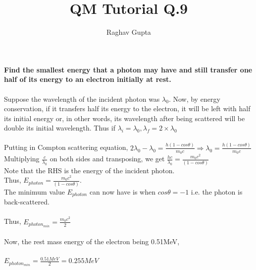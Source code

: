 \documentclass{article}
\begin{document}
\title{QM Tutorial Q.9}
\author{Raghav Gupta}
\maketitle
\textbf{Find the smallest energy that a photon may have and still transfer one half of its
energy to an electron initially at rest.}\\\\Suppose the wavelength of the incident photon was \(\lambda_0\). Now, by energy conservation, if it transfers half its energy to the electron, it will be left with half its initial energy or, in other words, its wavelength after being scattered will be double its initial wavelength. Thus if \(\lambda_i = \lambda_0, \lambda_f = 2\times \lambda_0\)\\\\Putting in Compton scattering equation, \(2\lambda_0 - \lambda_0 = \frac{h(1-cos\theta)}{m_0c} \Rightarrow \lambda_0 = \frac{h(1-cos\theta)}{m_0c}\)\\Multiplying \(\frac{c}{\lambda_0}\) on both sides and transposing, we get \(\frac{hc}{\lambda_0} = \frac{m_0c^2}{(1-cos\theta)}\)\\Note that the RHS is the energy of the incident photon.\\ Thus, \(E_{photon} = \frac{m_0c^2}{(1-cos\theta)}\).\\The minimum value \(E_{photon}\) can now have is when \(cos\theta = -1\) i.e. the photon is back-scattered.\\\\Thus, \(E_{photon_{min}} = \frac{m_0c^2}{2}\)\\\\Now, the rest mass energy of the electron being 0.51MeV,\\\\ \(E_{photon_{min}} = \frac{0.51MeV}{2} = 0.255MeV\)
\end{document}
